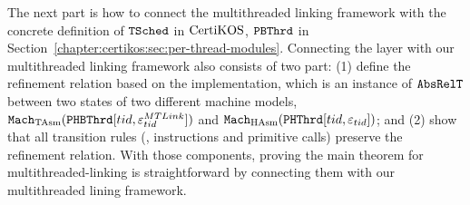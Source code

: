 The next part is how to connect the multithreaded linking framework with the concrete definition of  ${{\mathrm{\texttt{TSched}}}}$ in $\mathrm{CertiKOS}$, ${\mathrm{\texttt{PBThrd}}}$ in Section~\ref{chapter:certikos:sec:per-thread-modules}.
Connecting the layer with our multithreaded linking framework also consists of two part:  (1) define the refinement relation based on the implementation, which is an instance of ${\mathrm{\texttt{AbsRelT}}}$ between two states of two different machine models,
${\mathrm{\texttt{Mach}}}_{\mathrm{TAsm}}({\mathrm{\texttt{PHBThrd}}}[tid, {\varepsilon}^{MTLink}_{tid}])$ and 
${\mathrm{\texttt{Mach}}}_{\mathrm{HAsm}}({\mathrm{\texttt{PHThrd}}}[tid, {\varepsilon}_{tid}])$; and 
(2) show that all transition rules (\ie, instructions and primitive calls) preserve the refinement relation. 
With those components, proving the main theorem for multithreaded-linking is straightforward by connecting 
them with our multithreaded lining framework.


